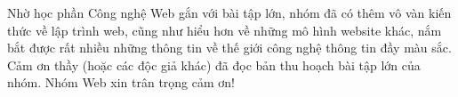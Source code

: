 \documentclass{article}
\begin{document}
\begin{warn}
Nhờ học phần Công nghệ Web gắn với bài tập lớn, nhóm đã có thêm vô vàn kiến thức về lập trình web, cũng như hiểu hơn về những mô hình website khác, nắm bắt được rất nhiều những thông tin về thế giới công nghệ thông tin đầy màu sắc.
Cảm ơn thầy (hoặc các độc giả khác) đã đọc bản thu hoạch bài tập lớn của nhóm.
Nhóm Web xin trân trọng cảm ơn!
\end{warn}

\end{document}
